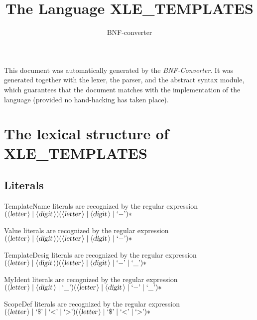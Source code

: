 \documentclass[a4paper,11pt]{article}
\author{BNF-converter}
\title{The Language XLE_TEMPLATES}
\begin{document}
\maketitle

\newcommand{\emptyP}{\mbox{$\epsilon$}}
\newcommand{\terminal}[1]{\mbox{{\texttt {#1}}}}
\newcommand{\nonterminal}[1]{\mbox{$\langle \mbox{{\sl #1 }} \! \rangle$}}
\newcommand{\arrow}{\mbox{::=}}
\newcommand{\delimit}{\mbox{$|$}}
\newcommand{\reserved}[1]{\mbox{{\texttt {#1}}}}
\newcommand{\literal}[1]{\mbox{{\texttt {#1}}}}
\newcommand{\symb}[1]{\mbox{{\texttt {#1}}}}

This document was automatically generated by the {\em BNF-Converter}. It was generated together with the lexer, the parser, and the abstract syntax module, which guarantees that the document matches with the implementation of the language (provided no hand-hacking has taken place).

\section*{The lexical structure of XLE_TEMPLATES}

\subsection*{Literals}







TemplateName literals are recognized by the regular expression
\(({\nonterminal{letter}} \mid {\nonterminal{digit}}) ({\nonterminal{letter}} \mid {\nonterminal{digit}} \mid \mbox{`{$-$}'})*\)

Value literals are recognized by the regular expression
\(({\nonterminal{letter}} \mid {\nonterminal{digit}}) ({\nonterminal{letter}} \mid {\nonterminal{digit}} \mid \mbox{`{$-$}'})*\)

TemplateDesig literals are recognized by the regular expression
\(({\nonterminal{letter}} \mid {\nonterminal{digit}}) ({\nonterminal{letter}} \mid {\nonterminal{digit}} \mid \mbox{`{$-$}'} \mid \mbox{`\_'})*\)

MyIdent literals are recognized by the regular expression
\(({\nonterminal{letter}} \mid {\nonterminal{digit}} \mid \mbox{`\_'}) ({\nonterminal{letter}} \mid {\nonterminal{digit}} \mid \mbox{`{$-$}'} \mid \mbox{`\_'})*\)

ScopeDef literals are recognized by the regular expression
\(({\nonterminal{letter}} \mid \mbox{`\$'} \mid \mbox{`{$<$}'} \mid \mbox{`{$>$}'}) ({\nonterminal{letter}} \mid \mbox{`\$'} \mid \mbox{`{$<$}'} \mid \mbox{`{$>$}'})*\)
\end{document}
